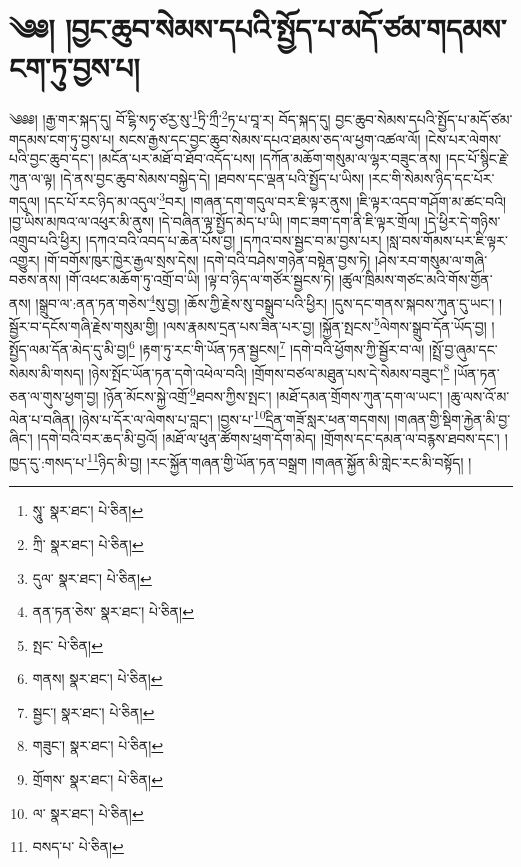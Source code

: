 \setcounter{footnote}{0} 
\chapter{༄༅། །བྱང་ཆུབ་སེམས་དཔའི་སྤྱོད་པ་མདོ་ཙམ་གདམས་ངག་ཏུ་བྱས་པ།}༄༅༅། །རྒྱ་གར་སྐད་དུ། བོ་ངྷི་སཏྭ་ཙརྱ་སུ་\footnote{སཱུ་  སྣར་ཐང་།  པེ་ཅིན། }ཏྲི་ཀྲྀ་\footnote{ཀྲི་  སྣར་ཐང་།  པེ་ཅིན། }ཏ་པ་བཱ་ར། བོད་སྐད་དུ། བྱང་ཆུབ་སེམས་དཔའི་སྤྱོད་པ་མདོ་ཙམ་གདམས་ངག་ཏུ་བྱས་པ། སངས་རྒྱས་དང་བྱང་ཆུབ་སེམས་དཔའ་ཐམས་ཅད་ལ་ཕྱག་འཚལ་ལོ། །ངེས་པར་ལེགས་པའི་བྱང་ཆུབ་དང་། །མངོན་པར་མཐོ་བ་ཐོབ་འདོད་པས། །དཀོན་མཆོག་གསུམ་ལ་ལྷར་བཟུང་ནས། །དང་པོ་སྙིང་རྗེ་ཀུན་ལ་ལྟ། །དེ་ནས་བྱང་ཆུབ་སེམས་བསྐྱེད་དེ། །ཐབས་དང་ལྡན་པའི་སྤྱོད་པ་ཡིས། །རང་གི་སེམས་ཉིད་དང་པོར་གདུལ། །དང་པོ་རང་ཉིད་མ་འདུལ་\footnote{དུལ་  སྣར་ཐང་།  པེ་ཅིན། }བར། །གཞན་དག་གདུལ་བར་ཇི་ལྟར་ནུས། །ཇི་ལྟར་འདབ་གཤོག་མ་ཚང་བའི། །བྱ་ཡིས་མཁའ་ལ་འཕུར་མི་ནུས། །དེ་བཞིན་ལྟ་སྤྱོད་མེད་པ་ཡི། །གང་ཟག་དག་ནི་ཇི་ལྟར་གྲོལ། །དེ་ཕྱིར་དེ་གཉིས་འགྲུབ་པའི་ཕྱིར། །དཀའ་བའི་འབད་པ་ཆེན་པོས་བྱ། །དཀའ་བས་སྦྱང་བ་མ་བྱས་པར། །སླ་བས་གོམས་པར་ཇི་ལྟར་འགྱུར། །གོ་བགོས་ཁུར་ཁྱེར་རྒྱལ་སྲས་དེས། །དགེ་བའི་བཤེས་གཉེན་བསྟེན་བྱས་ཏེ། །ཤེས་རབ་གསུམ་ལ་གཞི་བཅས་ནས། །གོ་འཕང་མཆོག་ཏུ་འགྲོ་བ་ཡི། །ལྟ་བ་ཉིད་ལ་གཙོར་སྦྱངས་ཏེ། །ཚུལ་ཁྲིམས་གཙང་མའི་གོས་གྱོན་ནས། །སྒྲུབ་ལ་:ནན་ཏན་གཅེས་\footnote{ནན་ཏན་ཅེས་  སྣར་ཐང་།  པེ་ཅིན། }སུ་བྱ། །ཆོས་ཀྱི་རྗེས་སུ་བསྒྲུབ་པའི་ཕྱིར། །དུས་དང་གནས་སྐབས་ཀུན་དུ་ཡང་། །སྦྱོར་བ་དངོས་གཞི་རྗེས་གསུམ་གྱི། །ལས་རྣམས་དྲན་པས་ཟིན་པར་བྱ། །སྐྱོན་སྤངས་\footnote{སྤང་  པེ་ཅིན། }ལེགས་སྒྲུབ་དོན་ཡོད་བྱ། །སྤྱོད་ལམ་དོན་མེད་དུ་མི་བྱ།\footnote{གནས།  སྣར་ཐང་།  པེ་ཅིན། } །རྟག་ཏུ་རང་གི་ཡོན་ཏན་སྦྱངས།\footnote{སྦྱང་།  སྣར་ཐང་།  པེ་ཅིན། } །དགེ་བའི་ཕྱོགས་ཀྱི་སྦྱོར་བ་ལ། །སྤྲོ་བྱ་ཞུམ་དང་སེམས་མི་གསད། །ཉེས་སྤོང་ཡོན་ཏན་དགེ་འཕེལ་བའི། །གྲོགས་བཙལ་མཐུན་པས་དེ་སེམས་བཟུང་།\footnote{གཟུང་།  སྣར་ཐང་།  པེ་ཅིན། } །ཡོན་ཏན་ཅན་ལ་གུས་ཕྱག་བྱ། །ཉོན་མོངས་སྐྱེ་འགྲོ་\footnote{གྲོགས་  སྣར་ཐང་།  པེ་ཅིན། }ཐབས་ཀྱིས་སྤང་། །མཐོ་དམན་གྲོགས་ཀུན་དག་ལ་ཡང་། །ཆུ་ལས་འོ་མ་ལེན་པ་བཞིན། །ཉེས་པ་དོར་ལ་ལེགས་པ་བླང་། །བྱས་པ་\footnote{ལ་  སྣར་ཐང་།  པེ་ཅིན། }དྲིན་གཟོ་སླར་ཕན་གདགས། །གཞན་གྱི་སྡིག་རྐྱེན་མི་བྱ་ཞིང་། །དགེ་བའི་བར་ཆད་མི་བྱའོ། །མཐོ་ལ་ཕུན་ཚོགས་ཕྲག་དོག་མེད། །གྲོགས་དང་དམན་ལ་བརྙས་ཐབས་དང་། །ཁྱད་དུ་:གསད་པ་\footnote{བསད་པ་  པེ་ཅིན། }ཉིད་མི་བྱ། །རང་སྐྱོན་གཞན་གྱི་ཡོན་ཏན་བསྒྲག །གཞན་སྐྱོན་མི་གླེང་རང་མི་བསྟོད། །
